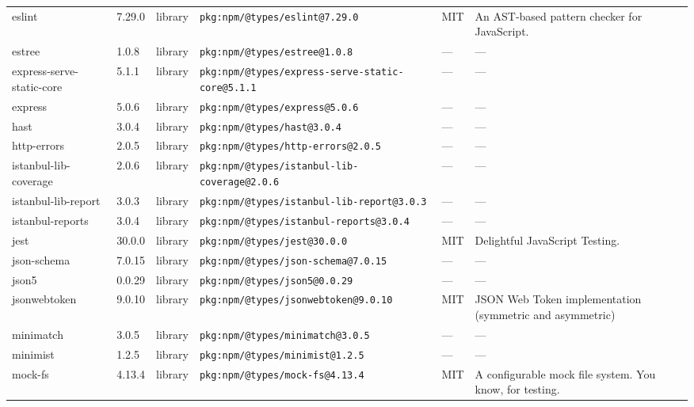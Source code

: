 \documentclass[11pt,a4paper]{article}
\begin{document}
\begin{longtable}{|p{4cm}|p{2cm}|p{1.6cm}|p{5cm}|p{1.5cm}|p{3.5cm}|}
\raggedright eslint & 7.29.0 & library & \small\texttt{pkg:npm/@types/eslint@7.29.0} & MIT & \small An AST-based pattern checker for JavaScript. \\
\raggedright estree & 1.0.8 & library & \small\texttt{pkg:npm/@types/estree@1.0.8} & — & \small — \\
\raggedright express-serve-static-core & 5.1.1 & library & \small\texttt{pkg:npm/@types/express-serve-static-core@5.1.1} & — & \small — \\
\raggedright express & 5.0.6 & library & \small\texttt{pkg:npm/@types/express@5.0.6} & — & \small — \\
\raggedright hast & 3.0.4 & library & \small\texttt{pkg:npm/@types/hast@3.0.4} & — & \small — \\
\raggedright http-errors & 2.0.5 & library & \small\texttt{pkg:npm/@types/http-errors@2.0.5} & — & \small — \\
\raggedright istanbul-lib-coverage & 2.0.6 & library & \small\texttt{pkg:npm/@types/istanbul-lib-coverage@2.0.6} & — & \small — \\
\raggedright istanbul-lib-report & 3.0.3 & library & \small\texttt{pkg:npm/@types/istanbul-lib-report@3.0.3} & — & \small — \\
\raggedright istanbul-reports & 3.0.4 & library & \small\texttt{pkg:npm/@types/istanbul-reports@3.0.4} & — & \small — \\
\raggedright jest & 30.0.0 & library & \small\texttt{pkg:npm/@types/jest@30.0.0} & MIT & \small Delightful JavaScript Testing. \\
\raggedright json-schema & 7.0.15 & library & \small\texttt{pkg:npm/@types/json-schema@7.0.15} & — & \small — \\
\raggedright json5 & 0.0.29 & library & \small\texttt{pkg:npm/@types/json5@0.0.29} & — & \small — \\
\raggedright jsonwebtoken & 9.0.10 & library & \small\texttt{pkg:npm/@types/jsonwebtoken@9.0.10} & MIT & \small JSON Web Token implementation (symmetric and asymmetric) \\
\raggedright minimatch & 3.0.5 & library & \small\texttt{pkg:npm/@types/minimatch@3.0.5} & — & \small — \\
\raggedright minimist & 1.2.5 & library & \small\texttt{pkg:npm/@types/minimist@1.2.5} & — & \small — \\
\raggedright mock-fs & 4.13.4 & library & \small\texttt{pkg:npm/@types/mock-fs@4.13.4} & MIT & \small A configurable mock file system.  You know, for testing. \\

\end{longtable}
\end{document}
